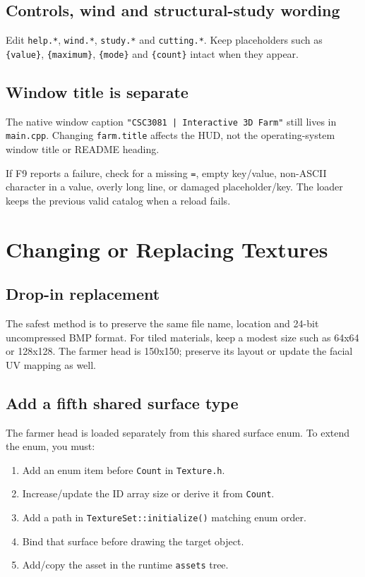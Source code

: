 \documentclass[11pt,a4paper,openany]{book}
\newcommand{\code}[1]{\texttt{#1}}
\newcommand{\file}[1]{\nolinkurl{#1}}
\begin{document}
\section{Controls, wind and structural-study wording}
Edit \code{help.*}, \code{wind.*}, \code{study.*} and \code{cutting.*}. Keep placeholders such as \code{\{value\}}, \code{\{maximum\}}, \code{\{mode\}} and \code{\{count\}} intact when they appear.

\section{Window title is separate}
The native window caption \code{"CSC3081 | Interactive 3D Farm"} still lives in \file{main.cpp}. Changing \code{farm.title} affects the HUD, not the operating-system window title or README heading.

\begin{warningbox}
	If F9 reports a failure, check for a missing \code{=}, empty key/value, non-ASCII character in a value, overly long line, or damaged placeholder/key. The loader keeps the previous valid catalog when a reload fails.
\end{warningbox}

\chapter{Changing or Replacing Textures}
\section{Drop-in replacement}
The safest method is to preserve the same file name, location and 24-bit uncompressed BMP format. For tiled materials, keep a modest size such as 64x64 or 128x128. The farmer head is 150x150; preserve its layout or update the facial UV mapping as well.

\section{Add a fifth shared surface type}
The farmer head is loaded separately from this shared surface enum. To extend the enum, you must:
\begin{enumerate}
	\item Add an enum item before \code{Count} in \file{Texture.h}.
	\item Increase/update the ID array size or derive it from \code{Count}.
	\item Add a path in \code{TextureSet::initialize()} matching enum order.
	\item Bind that surface before drawing the target object.
	\item Add/copy the asset in the runtime \file{assets} tree.
\end{enumerate}
\end{document}
